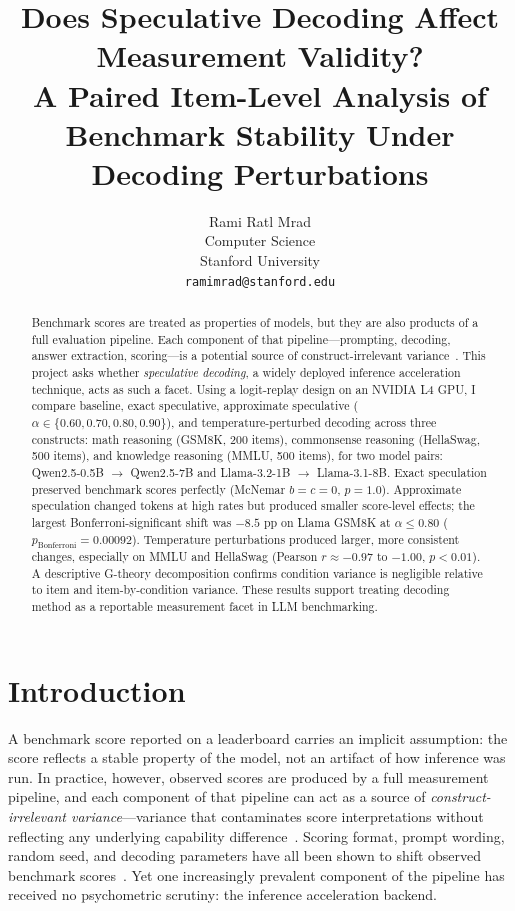 \documentclass{article}
\title{Does Speculative Decoding Affect Measurement Validity?\\
A Paired Item-Level Analysis of Benchmark Stability Under Decoding Perturbations}
\author{%
  Rami Ratl Mrad\\
  Computer Science\\
  Stanford University\\
  \texttt{ramimrad@stanford.edu}
}
\begin{document}
\maketitle

\begin{abstract}
Benchmark scores are treated as properties of models, but they are also products of a full evaluation pipeline. Each component of that pipeline---prompting, decoding, answer extraction, scoring---is a potential source of construct-irrelevant variance~\citep{messick1995validity}. This project asks whether \emph{speculative decoding}, a widely deployed inference acceleration technique, acts as such a facet. Using a logit-replay design on an NVIDIA L4 GPU, I compare baseline, exact speculative, approximate speculative ($\alpha \in \{0.60, 0.70, 0.80, 0.90\}$), and temperature-perturbed decoding across three constructs: math reasoning (GSM8K, 200 items), commonsense reasoning (HellaSwag, 500 items), and knowledge reasoning (MMLU, 500 items), for two model pairs: Qwen2.5-0.5B $\rightarrow$ Qwen2.5-7B and Llama-3.2-1B $\rightarrow$ Llama-3.1-8B. Exact speculation preserved benchmark scores perfectly (McNemar $b=c=0$, $p=1.0$). Approximate speculation changed tokens at high rates but produced smaller score-level effects; the largest Bonferroni-significant shift was $-8.5$ pp on Llama GSM8K at $\alpha \leq 0.80$ ($p_{\text{Bonferroni}}=0.00092$). Temperature perturbations produced larger, more consistent changes, especially on MMLU and HellaSwag (Pearson $r \approx -0.97$ to $-1.00$, $p<0.01$). A descriptive G-theory decomposition confirms condition variance is negligible relative to item and item-by-condition variance. These results support treating decoding method as a reportable measurement facet in LLM benchmarking.
\end{abstract}

\section{Introduction}

A benchmark score reported on a leaderboard carries an implicit assumption: the score reflects a stable property of the model, not an artifact of how inference was run. In practice, however, observed scores are produced by a full measurement pipeline, and each component of that pipeline can act as a source of \emph{construct-irrelevant variance}---variance that contaminates score interpretations without reflecting any underlying capability difference~\citep{messick1995validity}. Scoring format, prompt wording, random seed, and decoding parameters have all been shown to shift observed benchmark scores~\citep{dodge2020fine, liang2022holistic}. Yet one increasingly prevalent component of the pipeline has received no psychometric scrutiny: the inference acceleration backend.
\end{document}
